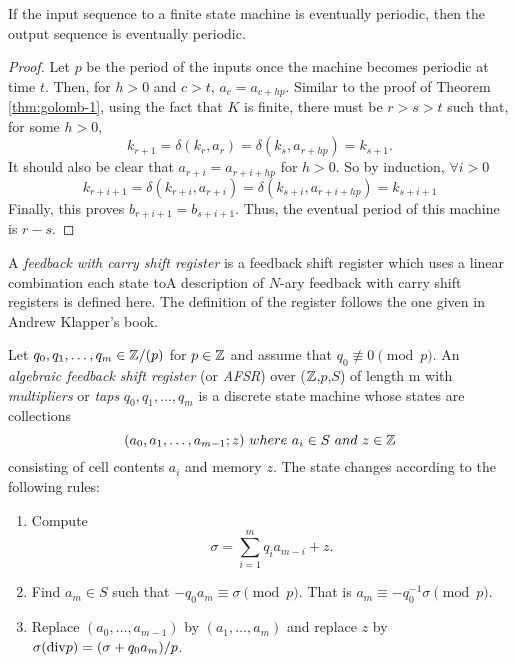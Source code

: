 \begin{theorem}\label{thm:golomb-2}
  If the input sequence to a finite state machine is eventually periodic, then the
  output sequence is eventually periodic.
\end{theorem}
\begin{proof}
  Let $p$ be the period of the inputs once the machine becomes periodic at time $t$.
  Then, for $h>0$ and $c>t$, $a_c=a_{c+hp}$. Similar to the proof of Theorem
  \ref{thm:golomb-1}, using the fact that $K$ is finite, there must be
  $r>s>t$ such that, for some $h>0$,
  \[
  k_{r+1}=\delta(k_r,a_r)=\delta(k_s,a_{r+hp})=k_{s+1}.
  \]
  It should also be clear that $a_{r+i}=a_{r+i+hp}$ for $h>0$. So by induction,
  $\forall i>0$
  \[
  k_{r+i+1}=\delta(k_{r+i},a_{r+i})=\delta(k_{s+i},a_{r+i+hp})=k_{s+i+1}
  \]
  Finally, this proves $b_{r+i+1}=b_{s+i+1}$. Thus, the eventual period of this
  machine is $r-s$.
\end{proof}

\par A {\em feedback with carry shift register} is a feedback shift register
which uses a linear combination each state toA description of $N$-ary feedback with
carry shift registers is defined here. The definition of the register follows the
one given in Andrew Klapper's book.

\begin{definition}\label{afsr}
  Let $q_0,q_1,\dots,q_m\in\mathbb{Z}/(p)$ for $p\in\mathbb{Z}$ and assume that
  $q_0\not\equiv0\pmod p$.
  An {\em algebraic feedback shift register} (or {\em AFSR}) over ($\mathbb{Z}$,$p$,$S$)
  of length m with {\em multipliers} or {\em taps} $q_0,q_1,\dots,q_m$ is a discrete
  state machine whose states are  collections
  \[
  (a_0,a_1,\dots,a_{m-1};z) \ where \ a_i\in S \ and \ z \in \zzz
  \]
  consisting of cell contents $a_i$ and memory $z$. The state changes according to
  the following rules:
  \begin{enumerate}[1.]
    \item Compute
      \[
      \sigma = \sum^m_{i=1}q_ia_{m-i}+z.
      \]
    \item Find $a_m\in S$ such that $-q_0a_m\equiv\sigma\pmod p$. That is
      $a_m\equiv-q_{0}^{-1}\sigma\pmod p$.
    \item Replace $(a_0,\dots,a_{m-1})$ by $(a_1,\dots,a_m)$ and replace $z$ by
      $\sigma({\rm div} p) = (\sigma+q_0a_m)/p$.
  \end{enumerate}
\end{definition}
